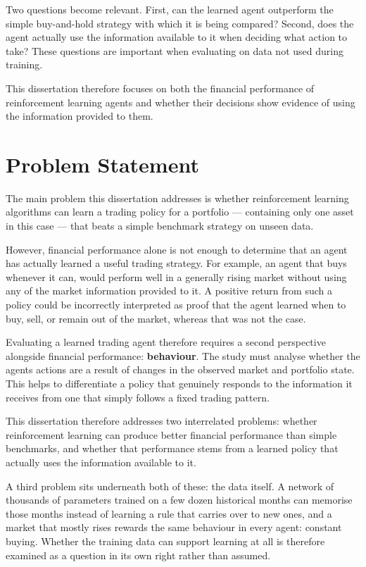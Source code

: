 Two questions become relevant. First, can the learned agent outperform
the simple buy-and-hold strategy with which it is being compared?
Second, does the agent actually use the information available to it when
deciding what action to take? These questions are important when
evaluating on data not used during training.

This dissertation therefore focuses on both the financial performance of
reinforcement learning agents and whether their decisions show evidence
of using the information provided to them.

\section{Problem Statement}

The main problem this dissertation addresses is whether reinforcement
learning algorithms can learn a trading policy for a portfolio ---
containing only one asset in this case --- that beats a simple benchmark
strategy on unseen data.

However, financial performance alone is not enough to determine that an
agent has actually learned a useful trading strategy. For example, an
agent that buys whenever it can, would perform well in a generally
rising market without using any of the market information provided to
it. A positive return from such a policy could be incorrectly
interpreted as proof that the agent learned when to buy, sell, or remain
out of the market, whereas that was not the case.

Evaluating a learned trading agent therefore requires a second
perspective alongside financial performance: \textbf{behaviour}. The
study must analyse whether the agent\textquotesingle s actions are a
result of changes in the observed market and portfolio state. This helps
to differentiate a policy that genuinely responds to the information it
receives from one that simply follows a fixed trading pattern.

This dissertation therefore addresses two interrelated problems: whether
reinforcement learning can produce better financial performance than
simple benchmarks, and whether that performance stems from a learned
policy that actually uses the information available to it.

A third problem sits underneath both of these: the data itself. A
network of thousands of parameters trained on a few dozen historical
months can memorise those months instead of learning a rule that carries
over to new ones, and a market that mostly rises rewards the same
behaviour in every agent: constant buying. Whether the training data can
support learning at all is therefore examined as a question in its own
right rather than assumed.

